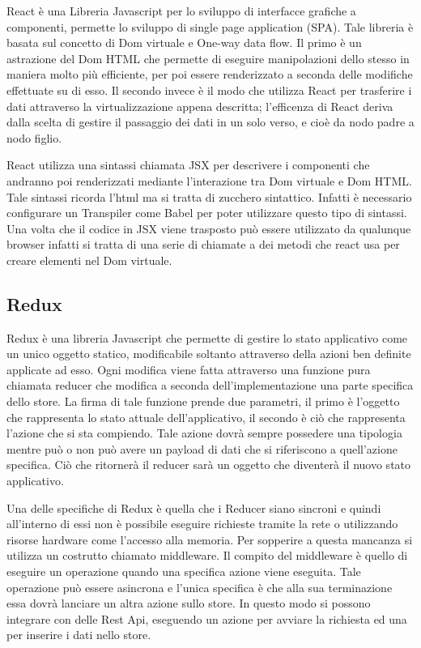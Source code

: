 React\cite{React} è una Libreria Javascript per lo sviluppo di interfacce grafiche a componenti, permette lo sviluppo di single page application (SPA). Tale libreria è basata sul concetto di Dom virtuale e One-way data flow. Il primo è un astrazione del Dom HTML che permette di eseguire manipolazioni dello stesso in maniera molto più efficiente, per poi essere renderizzato a seconda delle modifiche effettuate su di esso. Il secondo invece è il modo che utilizza React per trasferire i dati attraverso la virtualizzazione appena descritta; l'efficenza di React deriva dalla scelta di gestire il passaggio dei dati in un solo verso, e cioè da nodo padre a nodo figlio.\vspace{5mm}

React utilizza una sintassi chiamata JSX per descrivere i componenti che andranno poi renderizzati mediante l'interazione tra Dom virtuale e Dom HTML. Tale sintassi ricorda l'html ma si tratta di zucchero sintattico. Infatti è necessario configurare un Transpiler come Babel per poter utilizzare questo tipo di sintassi. Una volta che il codice in JSX viene trasposto può essere utilizzato da qualunque browser infatti si tratta di una serie di chiamate a dei metodi che react usa per creare elementi nel Dom virtuale.

	\subsection{Redux}\vspace{5mm}
	
	Redux è una libreria Javascript che permette di gestire lo stato applicativo come un unico oggetto statico, modificabile soltanto attraverso della azioni ben definite applicate ad esso. Ogni modifica viene fatta attraverso una funzione pura\cite{PureFunction} chiamata reducer che modifica a seconda dell'implementazione una parte specifica dello store. La firma di tale funzione prende due parametri, il primo è l'oggetto che rappresenta lo stato attuale dell'applicativo, il secondo è ciò che rappresenta l'azione che si sta compiendo. Tale azione dovrà sempre possedere una tipologia mentre può o non può avere un payload di dati che si riferiscono a quell'azione specifica. Ciò che ritornerà il reducer sarà un oggetto che diventerà il nuovo stato applicativo.\vspace{5mm}
	
	Una delle specifiche di Redux è quella che i Reducer siano sincroni e quindi all'interno di essi non è possibile eseguire richieste tramite la rete o utilizzando risorse hardware come l'accesso alla memoria. Per sopperire a questa mancanza si utilizza un costrutto chiamato middleware. Il compito del middleware è quello di eseguire un operazione quando una specifica azione viene eseguita. Tale operazione può essere asincrona e l'unica specifica è che alla sua terminazione essa dovrà lanciare un altra azione sullo store. In questo modo si possono integrare con delle Rest Api, eseguendo un azione per avviare la richiesta ed una per inserire i dati nello store.
	
